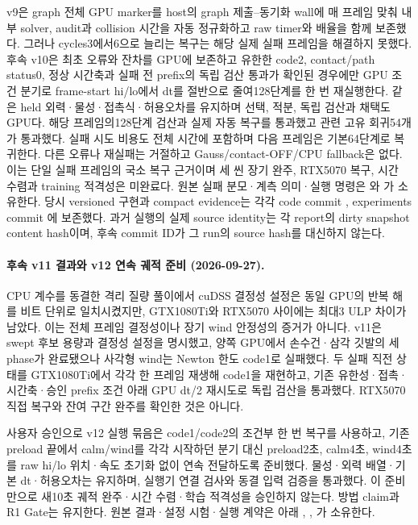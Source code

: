 \documentclass[10pt]{article}
\begin{document}
v9은 graph 전체 GPU marker를 host의 graph 제출--동기화 wall에 매 프레임 맞춰 내부 solver,
audit과 collision 시간을 자동 정규화하고 raw timer와 배율을 함께 보존했다.
그러나 cycles3에서6으로 늘리는 복구는 해당 실제 실패 프레임을 해결하지 못했다.
후속 v10은 최초 오류와 잔차를 GPU에 보존하고 유한한 code2, contact/path status0,
정상 시간축과 실패 전 prefix의 독립 검산 통과가 확인된 경우에만 GPU 조건 분기로
frame-start hi/lo에서 dt를 절반으로 줄여128단계를 한 번 재실행한다.
같은 held 외력·물성·접촉식·허용오차를 유지하며 선택, 적분, 독립 검산과 채택도 GPU다.
해당 프레임의128단계 검산과 실제 자동 복구를 통과했고 관련 고유 회귀54개가 통과했다.
실패 시도 비용도 전체 시간에 포함하며 다음 프레임은 기본64단계로 복귀한다.
다른 오류나 재실패는 거절하고 Gauss/contact-OFF/CPU fallback은 없다.
이는 단일 실패 프레임의 국소 복구 근거이며 세 씬 장기 완주, RTX5070 복구,
시간 수렴과 training 적격성은 미완료다. 원본 실패 분모·계측 의미·실행 명령은
와
가 소유한다.
당시 versioned 구현과 compact evidence는 각각 code commit ,
experiments commit 에 보존했다. 과거 실행의 실제 source identity는 각 report의
dirty snapshot content hash이며, 후속 commit ID가 그 run의 source hash를 대신하지 않는다.

\paragraph{후속 v11 결과와 v12 연속 궤적 준비 (2026-09-27).}
CPU 계수를 동결한 격리 질량 풀이에서 cuDSS 결정성 설정은 동일 GPU의 반복 해를
비트 단위로 일치시켰지만, GTX1080Ti와 RTX5070 사이에는 최대3 ULP 차이가 남았다.
이는 전체 프레임 결정성이나 장기 wind 안정성의 증거가 아니다.
v11은 swept 후보 용량과 결정성 설정을 명시했고, 양쪽 GPU에서 손수건·삼각 깃발의
세 phase가 완료됐으나 사각형 wind는 Newton 한도 code1로 실패했다.
두 실패 직전 상태를 GTX1080Ti에서 각각 한 프레임 재생해 code1을 재현하고,
기존 유한성·접촉·시간축·승인 prefix 조건 아래 GPU dt/2 재시도로 독립 검산을 통과했다.
RTX5070 직접 복구와 잔여 구간 완주를 확인한 것은 아니다.

사용자 승인으로 v12 실행 묶음은 code1/code2의 조건부 한 번 복구를 사용하고,
기존 preload 끝에서 calm/wind를 각각 시작하던 분기 대신 preload2초,
calm4초, wind4초를 raw hi/lo 위치·속도 초기화 없이 연속 전달하도록 준비했다.
물성·외력 배열·기본 dt·허용오차는 유지하며, 실행기 연결 검사와 동결 입력 검증을
통과했다. 이 준비만으로 새10초 궤적 완주·시간 수렴·학습 적격성을 승인하지 않는다.
방법 claim과 R1 Gate는 유지한다. 원본 결과·설정 시험·실행 계약은
 아래
, ,
가 소유한다.
\end{document}
